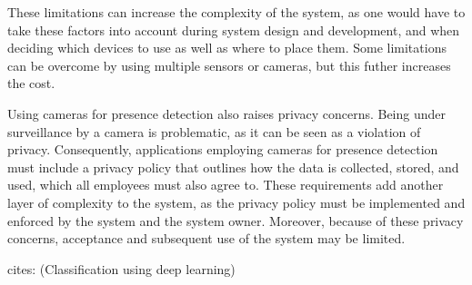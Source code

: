 These limitations can increase the complexity of the system, as one would have to take these factors into account during system design and development, and when deciding which devices to use as well as where to place them.
Some limitations can be overcome by using multiple sensors or cameras, but this futher increases the cost.\cite{FUERTES2022103473}

Using cameras for presence detection also raises privacy concerns.
Being under surveillance by a camera is problematic, as it can be seen as a violation of privacy.
Consequently, applications employing cameras for presence detection must include a privacy policy that outlines how the data is collected, stored, and used, which all employees must also agree to.
These requirements add another layer of complexity to the system, as the privacy policy must be implemented and enforced by the system and the system owner.
Moreover, because of these privacy concerns, acceptance and subsequent use of the system may be limited.\cite{granath_detecting_nodate, tang_occupancy_2020, PrivacyPreservingSensor}


cites: 
\cite{FUERTES2022103473} (Classification using deep learning)
